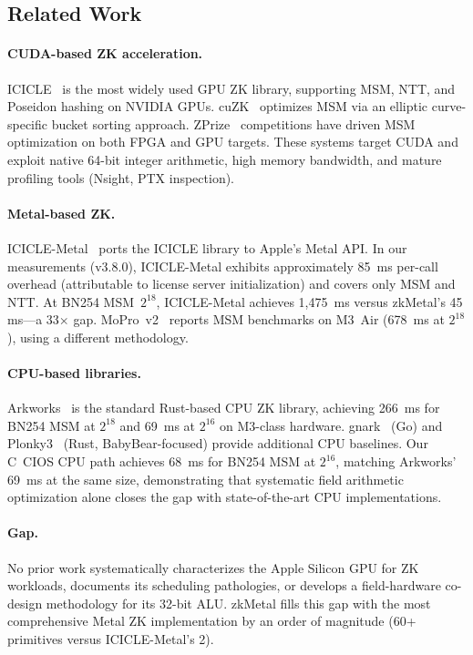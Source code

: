 \documentclass[letterpaper,twocolumn,10pt]{article}
\newcommand{\sys}{zkMetal\xspace}
\begin{document}
\subsection{Related Work}
\label{sec:related}

\paragraph{CUDA-based ZK acceleration.} ICICLE~\cite{icicle} is the most
widely used GPU ZK library, supporting MSM, NTT, and Poseidon hashing on
NVIDIA GPUs. cuZK~\cite{cuzk} optimizes MSM via an elliptic curve-specific
bucket sorting approach. ZPrize~\cite{zprize2022,zprize2023} competitions
have driven MSM optimization on both FPGA and GPU targets. These systems
target CUDA and exploit native 64-bit integer arithmetic, high memory
bandwidth, and mature profiling tools (Nsight, PTX inspection).

\paragraph{Metal-based ZK.} ICICLE-Metal~\cite{icicle} ports the ICICLE
library to Apple's Metal API. In our measurements (v3.8.0), ICICLE-Metal
exhibits approximately 85~ms per-call overhead (attributable to license
server initialization) and covers only MSM and NTT. At BN254 MSM~$2^{18}$,
ICICLE-Metal achieves 1{,}475~ms versus \sys's 45\,ms---a 33$\times$ gap.
MoPro~v2~\cite{mopro} reports MSM benchmarks on M3~Air (678~ms at
$2^{18}$), using a different methodology.

\paragraph{CPU-based libraries.} Arkworks~\cite{arkworks} is the standard
Rust-based CPU ZK library, achieving 266~ms for BN254 MSM at $2^{18}$ and
69~ms at $2^{16}$ on M3-class hardware. gnark~\cite{gnark} (Go) and
Plonky3~\cite{plonky3} (Rust, BabyBear-focused) provide additional CPU
baselines. Our C~CIOS CPU path achieves 68~ms for BN254 MSM at $2^{16}$,
matching Arkworks' 69~ms at the same size, demonstrating that systematic
field arithmetic optimization alone closes the gap with state-of-the-art
CPU implementations.

\paragraph{Gap.} No prior work systematically characterizes the Apple
Silicon GPU for ZK workloads, documents its scheduling pathologies, or
develops a field-hardware co-design methodology for its 32-bit ALU. \sys
fills this gap with the most comprehensive Metal ZK implementation by an
order of magnitude (60+ primitives versus ICICLE-Metal's 2).
\end{document}

